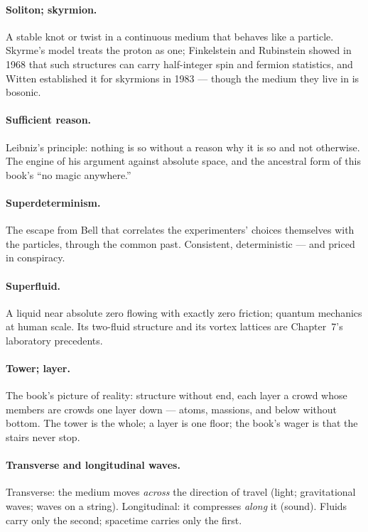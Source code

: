 \documentclass[fontsize=11pt,paper=a4,pagesize=auto,parskip=half-]{scrbook}
\begin{document}
\paragraph{Soliton; skyrmion.} A stable knot or twist in a continuous medium that behaves like a particle. Skyrme's model treats the proton as one; Finkelstein and Rubinstein showed in 1968 that such structures can carry half-integer spin and fermion statistics, and Witten established it for skyrmions in 1983 --- though the medium they live in is bosonic.

\paragraph{Sufficient reason.} Leibniz's principle: nothing is so without a reason why it is so and not otherwise. The engine of his argument against absolute space, and the ancestral form of this book's ``no magic anywhere.''

\paragraph{Superdeterminism.} The escape from Bell that correlates the experimenters' choices themselves with the particles, through the common past. Consistent, deterministic --- and priced in conspiracy.

\paragraph{Superfluid.} A liquid near absolute zero flowing with exactly zero friction; quantum mechanics at human scale. Its two-fluid structure and its vortex lattices are Chapter~7's laboratory precedents.

\paragraph{Tower; layer.} The book's picture of reality: structure without end, each layer a crowd whose members are crowds one layer down --- atoms, massions, and below without bottom. The tower is the whole; a layer is one floor; the book's wager is that the stairs never stop.

\paragraph{Transverse and longitudinal waves.} Transverse: the medium moves \emph{across} the direction of travel (light; gravitational waves; waves on a string). Longitudinal: it compresses \emph{along} it (sound). Fluids carry only the second; spacetime carries only the first.
\end{document}
